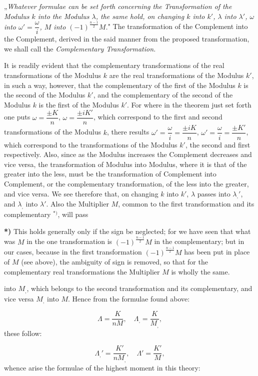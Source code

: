 \documentclass{article}
\begin{document}
„\emph{Whatever formulae can be set forth concerning the Transformation of the Modulus $k$ into the Modulus $\lambda$, the same hold, on changing $k$ into $k'$, $\lambda$ into $\lambda'$, $\omega$ into $\omega'=\dfrac{\omega}{i}$, $M$ into $(-1)^{\frac{n-1}{2}}M$.}"
The transformation of the Complement into the Complement, derived in the said manner from the proposed transformation, we shall call the \emph{Complementary Transformation.}

It is readily evident that the complementary transformations of the real transformations of the Modulus $k$ are the real transformations of the Modulus $k'$, in such a way, however, that the complementary of the first of the Modulus $k$ is the second of the Modulus $k'$, and the complementary of the second of the Modulus $k$ is the first of the Modulus $k'$. For where in the theorem just set forth one puts $\omega=\dfrac{\pm K}{n}$, $\omega=\dfrac{\pm iK'}{n}$, which correspond to the first and second transformations of the Modulus $k$, there results $\omega'=\dfrac{\omega}{i}=\dfrac{\pm iK}{n}$, $\omega'=\dfrac{\omega}{i}=\dfrac{\pm K'}{n}$, which correspond to the transformations of the Modulus $k'$, the second and first respectively. Also, since as the Modulus increases the Complement decreases and vice versa, the transformation of Modulus into Modulus, where it is that of the greater into the less, must be the transformation of Complement into Complement, or the complementary transformation, of the less into the greater, and vice versa. We see therefore that, on changing $k$ into $k'$, $\lambda$ passes into $\lambda_{,}'$, and $\lambda_{,}$ into $\lambda'$. Also the Multiplier $M$, common to the first transformation and its complementary ${}^{*)}$, will pass

\textbf{*)} This holds generally only if the sign be neglected; for we have seen that what was $M$ in the one transformation is $(-1)^{\frac{n-1}{2}}M$ in the complementary; but in our cases, because in the first transformation $(-1)^{\frac{n-1}{2}}M$ has been put in place of $M$ (see above), the ambiguity of sign is removed, so that for the complementary real transformations the Multiplier $M$ is wholly the same.

into $M_{,}$, which belongs to the second transformation and its complementary, and vice versa $M_{,}$ into $M$. Hence from the formulae found above:

\[
\Lambda=\frac{K}{nM},\quad\Lambda_{,}=\frac{K}{M_{,}},
\]
these follow:

\[
\Lambda_{,}'=\frac{K'}{nM_{,}},\quad\Lambda'=\frac{K'}{M},
\]
whence arise the formulae of the highest moment in this theory:
\end{document}
